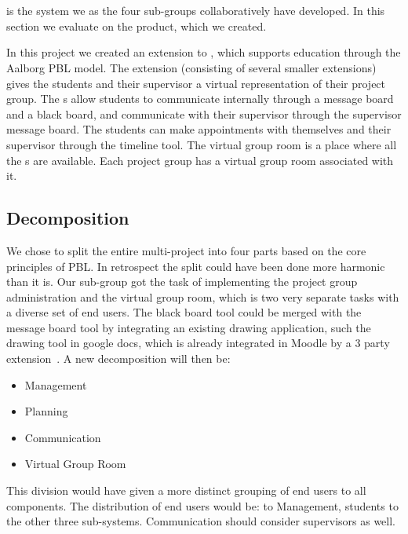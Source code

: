 \section{\system{}}
\label{sec:productsystem}
\system{} is the system we as the four sub-groups collaboratively have developed.
In this section we evaluate on the product, which we created.


In this project we created an extension to \moodle{}, which supports education through the Aalborg PBL model. 
The extension (consisting of several smaller extensions) gives the students and their supervisor a virtual representation of their project group. 
The \detdeandrelaver{}s allow students to communicate internally through a message board and a black board, and communicate with their supervisor through the supervisor message board.
The students can make appointments with themselves and their supervisor through the timeline tool.
The virtual group room is a place where all the \detdeandrelaver{}s are available.
Each project group has a virtual group room associated with it.


\subsection{Decomposition}
We chose to split the entire multi-project into four parts based on the core principles of PBL. 
In retrospect the split could have been done more harmonic than it is.
Our sub-group got the task of implementing the project group administration and the virtual group room, which is two very separate tasks with a diverse set of end users. 
The black board tool could be merged with the message board tool by integrating an existing drawing application, such the drawing tool in google docs, which is already integrated in Moodle by a 3\rd{} party extension~\cite{moodlegoogleapp}. 
A new decomposition will then be:
\begin{itemize}
	\item Management
	\item Planning
	\item Communication
	\item Virtual Group Room
\end{itemize}

This division would have given a more distinct grouping of end users to all components.
The distribution of end users would be:
\admpers[c] to Management, students to the other three sub-systems. 
Communication should consider supervisors as well.



